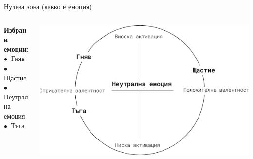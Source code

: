 \documentclass[9pt]{beamer}
\begin{document}
    \begin{frame}{Нулева зона (какво е емоция)}
        \begin{columns}[T] %
            \begin{column}{.38\textwidth}
                \textbf{Избрани емоции:}
                \vspace{1cm}\\
                $\bullet\ $ Гняв
                \vspace{1cm}\\
                $\bullet\ $ Щастие
                \vspace{1cm}\\
                $\bullet\ $ Неутрална емоция
                \vspace{1cm}\\
                $\bullet\ $ Тъга
            \end{column}%
            \hfill%
            \begin{column}{.60\textwidth}
                \vspace{1cm}
                \begin{center}
                    \includegraphics[width=\textwidth]{valence_arousal_ahns}%
                \end{center}
            \end{column}%
        \end{columns}
    \end{frame}
\end{document}
